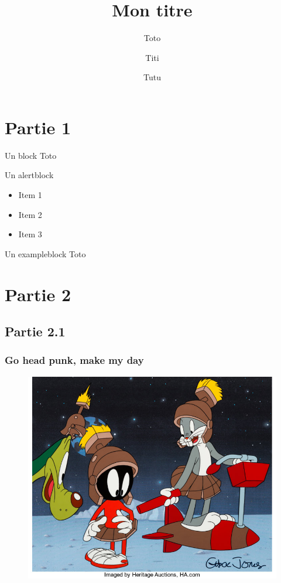 \documentclass{beamer}
\title{Mon titre}
\author{Toto \and Titi \and Tutu}
\institute{Université de Caen Normandie}
\begin{document}
\begin{frame}
\titlepage
\end{frame}

\begin{frame}
\tableofcontents
\end{frame}

\section{Partie 1}

\begin{frame}
%
\begin{block}{Un block}
Toto
\end{block}
%
\begin{alertblock}{Un alertblock}
	\begin{itemize}
		\item Item 1
		\item Item 2
		\item Item 3
	\end{itemize}
\end{alertblock}
%
\begin{exampleblock}{Un exampleblock}
Toto
\end{exampleblock}
%
\end{frame}

\section{Partie 2}

\subsection{Partie 2.1}

\begin{frame}
\frametitle{Go head punk, make my day}
%
\begin{figure}[ht!]
 \centering
 \includegraphics[width=0.7\linewidth]{picture.jpg}
\end{figure}
%
\end{frame}
\end{document}

